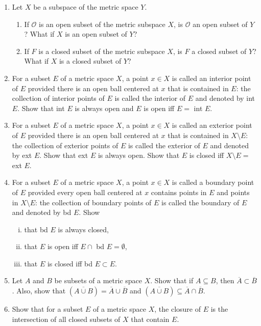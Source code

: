 \begin{enumerate}
    
    \item Let $X$ be a subspace of the metric space $Y$.
    \begin{enumerate}
        \item If $\mathcal{O}$ is an open subset of the metric subspace $X$, is $\mathcal{O}$ an open subset of $Y$?
        What if $X$ is an open subset of $Y$?
        \item If $F$ is a closed subset of the metric subspace $X$, is $F$ a closed subset of $Y$?
        What if $X$ is a closed subset of $Y$?
    \end{enumerate}
    \item For a subset $E$ of a metric space $X$, a point $x\in X$ is called an interior point of $E$ provided there is an open ball centered at $x$ that is contained in $E$:
    the collection of interior points of $E$ is called the interior of $E$ and denoted by int $E$.
    Show that int $E$ is always open and $E$ is open iff $E=$ int $E$.
    \item For a subset $E$ of a metric space $X$, a point $x\in X$ is called an exterior point of $E$ provided there is an open ball centered at $x$ that is contained in $X\setminus E$: 
    the collection of exterior points of $E$ is called the exterior of $E$ and denoted by ext $E$.
    Show that ext $E$ is always open.
    Show that $E$ is closed iff $X\setminus E=$ ext $E$.
    \item For a subset $E$ of a metric space $X$, a point $x\in X$ is called a boundary point of $E$ provided every open ball centered at $x$ contains points in $E$ and points in $X\setminus E$:
    the collection of boundary points of $E$ is called the boundary of $E$ and denoted by bd $E$.
    Show 
    \begin{enumerate}[(i)]
        \item that bd $E$ is always closed,
        \item that $E$ is open iff $E\cap$ bd $E=\emptyset$,
        \item that $E$ is closed iff bd $E\subset E$.
    \end{enumerate}
    \item Let $A$ and $B$ be subsets of a metric space $X$.
    Show that if $A\subseteq B$, then $\overline{A}\subset\overline{B}$.
    Also, show that $(\overline{A\cup B})=\overline{A}\cup\overline{B}$ and $(\overline{A\cup B})\subseteq\overline{A}\cap\overline{B}$.
    \item Show that for a subset $E$ of a metric space $X$, the closure of $E$ is the intersection of all closed subsets of $X$ that contain $E$.
\end{enumerate}

